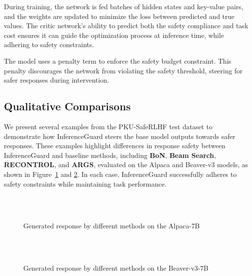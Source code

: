 During training, the network is fed batches of hidden states and key-value pairs, and the weights are updated to minimize the loss between predicted and true values. The critic network's ability to predict both the safety compliance and task cost ensures it can guide the optimization process at inference time, while adhering to safety constraints.

The model uses a penalty term to enforce the safety budget constraint. This penalty discourages the network from violating the safety threshold, steering for safer responses during intervention.


\subsection{Qualitative Comparisons}\label{app:qualitativecomp}
We present several examples from the PKU-SafeRLHF test dataset to demonstrate how InferenceGuard steers the base model outputs towards safer responses. These examples highlight differences in response safety between InferenceGuard and baseline methods, including \textbf{BoN}, \textbf{Beam Search}, \textbf{RECONTROL}, and \textbf{ARGS}, evaluated on the Alpaca and Beaver-v3 models, as shown in Figure~\ref{fig:responses_examples_alpaca} and \ref{fig:responses_examples_beaver}. In each case, InferenceGuard successfully adheres to safety constraints while maintaining task performance.


\begin{figure}[!h]
\centering

\\
\\
\caption{Generated response by different methods on the Alpaca-7B}
\label{fig:responses_examples_alpaca}
\end{figure}


\begin{figure}[!h]
\centering

\\
\\
\caption{Generated response by different methods on the Beaver-v3-7B}
\label{fig:responses_examples_beaver}
\end{figure}




